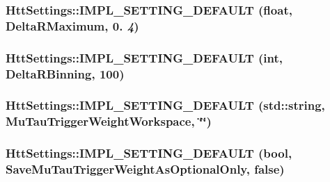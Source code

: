 \label{classHttSettings_a985e2cd59bd900213f04ee61aa532d85}
\hypertarget{classHttSettings_a02117824c52f6935030c7c52224d0e9d}{
\subsubsection[{IMPL\_\-SETTING\_\-DEFAULT}]{\setlength{\rightskip}{0pt plus 5cm}HttSettings::IMPL\_\-SETTING\_\-DEFAULT (float, \/  DeltaRMaximum, \/  0. {\em 4})}}
\label{classHttSettings_a02117824c52f6935030c7c52224d0e9d}
\hypertarget{classHttSettings_a3dcf03b7bfe0a248a70f1528ada185cb}{
\subsubsection[{IMPL\_\-SETTING\_\-DEFAULT}]{\setlength{\rightskip}{0pt plus 5cm}HttSettings::IMPL\_\-SETTING\_\-DEFAULT (int, \/  DeltaRBinning, \/  100)}}
\label{classHttSettings_a3dcf03b7bfe0a248a70f1528ada185cb}
\hypertarget{classHttSettings_ad5430ca5352c70d79ccce3b996973fb3}{
\subsubsection[{IMPL\_\-SETTING\_\-DEFAULT}]{\setlength{\rightskip}{0pt plus 5cm}HttSettings::IMPL\_\-SETTING\_\-DEFAULT (std::string, \/  MuTauTriggerWeightWorkspace, \/  \char`\"{}\char`\"{})}}
\label{classHttSettings_ad5430ca5352c70d79ccce3b996973fb3}
\hypertarget{classHttSettings_a2c395317a2b6371baae4e5b69215e80f}{
\subsubsection[{IMPL\_\-SETTING\_\-DEFAULT}]{\setlength{\rightskip}{0pt plus 5cm}HttSettings::IMPL\_\-SETTING\_\-DEFAULT (bool, \/  SaveMuTauTriggerWeightAsOptionalOnly, \/  false)}}
\label{classHttSettings_a2c395317a2b6371baae4e5b69215e80f}
